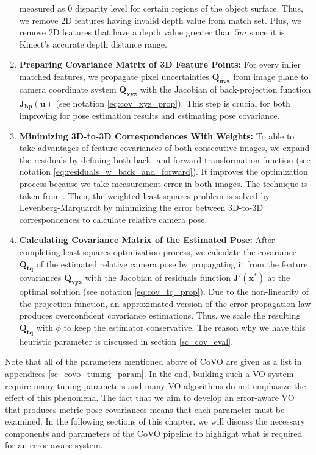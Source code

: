 \documentclass[a4paper]{report}
\numberwithin{figure}{section}
\begin{document}
\begin{enumerate}
    measured as 0 disparity level for certain regions of the object surface.
    Thus, we remove 2D features having invalid depth value from match set.
    Plus, we remove 2D features that have a depth value greater than $5m$ since
    it is Kinect's accurate depth distance range. 
  \item \textbf{Preparing Covariance Matrix of 3D Feature Points:} For every
    inlier matched features, we propagate pixel uncertainties
    $\mathbf{Q_{uvz}}$ from image plane to camera coordinate system
    $\mathbf{Q_{xyz}}$ with the Jacobian of back-projection function
    $\mathbf{J_{bp}}(\mathbf{u})$ (see notation \eqref{eq:cov_xyz_prop}). This
    step is crucial for both improving for pose estimation results and
    estimating pose covariance.  
  \item \textbf{Minimizing 3D-to-3D Correspondences With Weights:} To able to
    take advantages of feature covariances of both consecutive images, we
    expand the residuals by defining both back- and forward transformation
    function (see notation \eqref{eq:residuals_w_back_and_forward}).  It 
    improves
    the optimization process because we take measurement error in both images.
    The technique is taken from \parencite[see][101]{RichardHartley2003}.  
    Then, 
    the
    weighted least squares problem is solved by Levenberg-Marquardt by
    minimizing the error between 3D-to-3D correspondences to calculate relative
    camera pose.  
  \item \textbf{Calculating Covariance Matrix of the Estimated Pose:} After
    completing least squares optimization process, we calculate the covariance
    $\mathbf{Q_{tq}}$ of the estimated relative camera pose by propagating it
    from the feature covariances $\mathbf{Q_{xyz}}$ with the Jacobian of
    residuals function $\mathbf{J'}(\mathbf{x^*})$ at the optimal solution (see
    notation \eqref{eq:cov_tq_prop}).  Due to the non-linearity of the 
    projection
    function, an approximated version of the error propagation law produces
    overconfident covariance estimations. Thus, we scale the resulting
    $\mathbf{Q_{tq}}$ with $\phi$ to keep the estimator conservative.  The
    reason why we have this heuristic parameter is discussed in section
    \ref{sc_cov_eval}.  
\end{enumerate}

Note that all of the parameters mentioned above of CoVO are given as a list in
appendices \ref{sc_covo_tuning_param}.  In the end, building such a VO system
require many tuning parameters and many VO algorithms do not emphasize the
effect of this phenomena.  The fact that we aim to develop an error-aware VO
that produces metric pose covariances means that each parameter must be
examined.  In the following sections of this chapter, we will discuss the
necessary components and parameters of the CoVO pipeline to highlight what is
required for an error-aware system.
\end{document}
